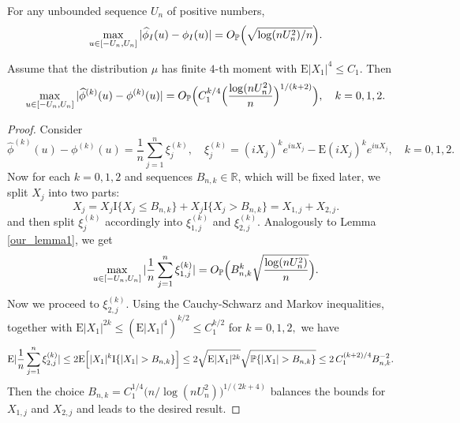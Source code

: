 \documentclass[10pt,a4paper]{amsart}
\newcommand{\E}{\mathrm{E}}
\newcommand{\I}{{\mathrm{I}}}
\newcommand{\R}{\mathbb{R}}
\renewcommand{\P}{\mathbb{P}}
\begin{document}
\begin{lemma}\label{our_lemma1}
For any unbounded sequence $U_n$ of positive numbers,\begin{align*}
      \max_{u \in [-U_n, U_n]}  |\widehat\phi_I(u) - \phi_I(u)| = O_{\P} \Bigl( 
        \sqrt{
\log(nU_n^2) / n
}
        \Bigr).
    \end{align*}
 \end{lemma}

\begin{lemma}\label{our_lemma2}
    Assume that the distribution $\mu$ has finite $4$-th moment with $\E|X_1|^4 \leq C_1$. Then
    \begin{equation*}
        \max_{u\in [-U_n, U_n]} |\widehat{\phi}^{(k)}(u) - \phi^{(k)}(u)| = O_{\mathbb{P}} \Bigl(C_1^{k/4}\Bigl(\frac{\log(nU^2_n)}{n}\Bigr)^{1/(k + 2)}\Bigr), \quad k=0,1,2.
    \end{equation*}
\end{lemma}

\begin{proof}
    Consider
\begin{equation*}
    \widehat{\phi}^{(k)}(u) - \phi^{(k)}(u) = \frac{1}{n}\sum_{j=1}^{n} \xi^{(k)}_j, \quad  \xi^{(k)}_j = (iX_j)^ke^{iuX_j} - \E (iX_j)^ke^{iuX_j}, \quad  k=0,1,2.
\end{equation*}
Now for each $k=0,1,2$ and  sequences $B_{n,k} \in \R$, which will be fixed later, we split $X_j$ into two parts:
\begin{equation*}
    X_j = X_j \I\{X_j \leq B_{n,k}\} + X_j \I\{X_j > B_{n,k}\} = X_{1, j} +X_{2, j}.
\end{equation*}
and then split $\xi^{(k)}_j$ accordingly into  $\xi^{(k)}_{1, j}$ and $\xi^{(k)}_{2, j}$.  Analogously to Lemma \ref{our_lemma1}, we get 
\begin{equation*}
    \max_{u \in [-U_n, U_n]} |\frac{1}{n}\sum_{j=1}^{n}\xi^{(k)}_{1, j}| =O_{\mathbb{P}} \Bigl(B_{n,k}^k \sqrt{\frac{\log(nU_n^2)}{n}}\Bigr).
\end{equation*}
Now we proceed to $\xi^{(k)}_{2, j}$. 
Using the Cauchy-Schwarz  and Markov inequalities, together with $\E|X_1|^{2k}\leq (\E|X_1|^4)^{k/2}\leq C_1^{k/2}$ for $k=0,1,2,$ we have
\begin{align*}
    \E |\frac{1}{n}\sum_{j=1}^{n}\xi^{(k)}_{2, j}| 
    &\leq
    2 \E \Bigl[ |X_1|^k\I\{|X_1| > B_{n,k}\} \Bigr] 
    \leq 2 \sqrt{\E |X_1|^{2k}} \sqrt{\mathbb{P}\{|X_1| > B_{n,k}\}}  \leq 2\, C_1^{(k+2)/4} B_{n,k}^{-2}.
\end{align*}
Then the choice $B_{n,k} = C_1^{1/4}\bigl(n / \log(nU_n^2) \bigr)^{1/(2k + 4)}$ balances the bounds for \(X_{1, j}\) and \(X_{2, j}\) and leads to the desired result. 
\end{proof}
\end{document}
